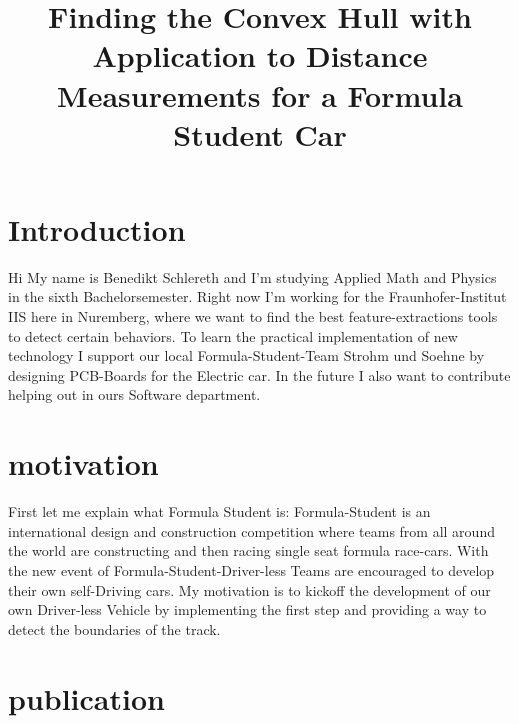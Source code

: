 \documentclass[10pt,a4paper]{article}
\title{Finding the Convex Hull with Application to Distance Measurements for a Formula Student Car}
\begin{document}
	\maketitle
	
	\section{Introduction}
	Hi
	My name is Benedikt Schlereth and I'm studying Applied Math and Physics in the sixth Bachelorsemester. 
	Right now I'm working for the Fraunhofer-Institut IIS here in Nuremberg, where we want to find the best feature-extractions tools to detect certain behaviors.
	To learn the practical implementation of new technology I support our local Formula-Student-Team Strohm und Soehne by designing PCB-Boards for the Electric car.
	In the future I also want to contribute helping out in ours Software department.
	
	
	\section{motivation}
	First let me explain what Formula Student is:
	Formula-Student is an international design and construction competition where teams from all around the world are constructing and then racing single seat formula race-cars.
	With the new event of Formula-Student-Driver-less Teams are encouraged to develop their own self-Driving cars.
	My motivation is to kickoff the development of our own Driver-less Vehicle by implementing the first step and providing a way to detect the boundaries of the track. 
	
	
	
	\section{publication}
	
\end{document}

